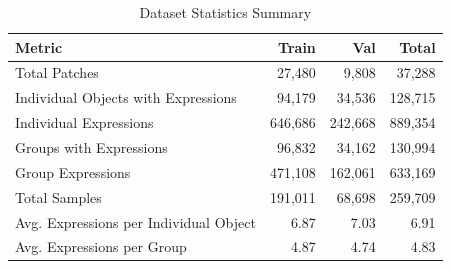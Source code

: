 \begin{table}[H]
\centering
\caption{Dataset Statistics Summary}
\label{tab:dataset_stats}
\begin{tabular}{@{}lrrr@{}}
\toprule
\textbf{Metric} & \textbf{Train} & \textbf{Val} & \textbf{Total} \\
\midrule
Total Patches & 27,480 & 9,808 & 37,288 \\
Individual Objects with Expressions & 94,179 & 34,536 & 128,715 \\
Individual Expressions & 646,686 & 242,668 & 889,354 \\
Groups with Expressions & 96,832 & 34,162 & 130,994 \\
Group Expressions & 471,108 & 162,061 & 633,169 \\
Total Samples & 191,011 & 68,698 & 259,709 \\
Avg. Expressions per Individual Object & 6.87 & 7.03 & 6.91 \\
Avg. Expressions per Group & 4.87 & 4.74 & 4.83 \\
\bottomrule
\end{tabular}
\end{table}

